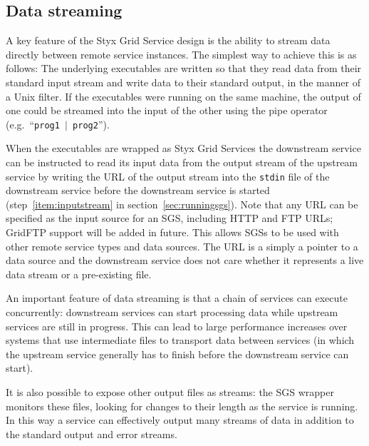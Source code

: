 \documentclass[a4paper]{article}
\begin{document}
\begin{multicols}{2}
\subsection{Data streaming} \label{sec:datastreaming}
A key feature of the Styx Grid Service design is the ability to stream data directly between remote service instances.  The simplest way to achieve this is as follows:  The underlying executables are written so that they read data from their standard input stream and write data to their standard output, in the manner of a Unix filter.  If the executables were running on the same machine, the output of one could be streamed into the input of the other using the pipe operator (e.g.\ ``\texttt{prog1 $|$ prog2}'').

When the executables are wrapped as Styx Grid Services the downstream service can be instructed to read its input data from the output stream of the upstream service by writing the URL of the output stream into the \texttt{stdin} file of the downstream service before the downstream service is started (step~\ref{item:inputstream} in section~\ref{sec:runningsgs}).
Note that any URL can be specified as the input source for an SGS, including HTTP and FTP URLs; GridFTP support will be added in future.  This allows SGSs to be used with other remote service types and data sources.  The URL is a simply a pointer to a data source and the downstream service does not care whether it represents a live data stream or a pre-existing file.

An important feature of data streaming is that a chain of services can execute concurrently: downstream services can start processing data while upstream services are still in progress.  This can lead to large performance increases over systems that use intermediate files to transport data between services (in which the upstream service generally has to finish before the downstream service can start).

It is also possible to expose other output files as streams: the SGS wrapper monitors these files, looking for changes to their length as the service is running.  In this way a service can effectively output many streams of data in addition to the standard output and error streams.


\end{multicols}
\end{document}
